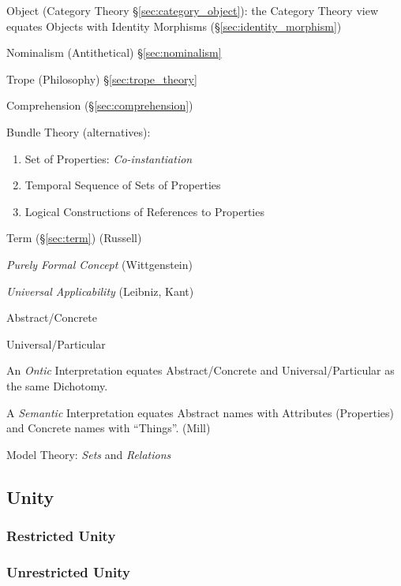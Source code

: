Object (Category Theory \S\ref{sec:category_object}): the Category
Theory view equates Objects with Identity Morphisms
(\S\ref{sec:identity_morphism})

Nominalism (Antithetical) \S\ref{sec:nominalism}

Trope (Philosophy) \S\ref{sec:trope_theory}

Comprehension (\S\ref{sec:comprehension})

Bundle Theory (alternatives):
\begin{enumerate}
  \item Set of Properties: \emph{Co-instantiation}
  \item Temporal Sequence of Sets of Properties
  \item Logical Constructions of References to Properties
\end{enumerate}

Term (\S\ref{sec:term}) (Russell)

\emph{Purely Formal Concept} (Wittgenstein)

\emph{Universal Applicability} (Leibniz, Kant)

Abstract/Concrete

Universal/Particular

An \emph{Ontic} Interpretation equates Abstract/Concrete and
Universal/Particular as the same Dichotomy.

A \emph{Semantic} Interpretation equates Abstract names with
Attributes (Properties) and Concrete names with ``Things''. (Mill)

Model Theory: \emph{Sets} and \emph{Relations}



\subsection{Unity}\label{sec:unity}

\subsubsection{Restricted Unity}\label{sec:restricted_unity}

\subsubsection{Unrestricted Unity}\label{sec:unrestricted_unity}



